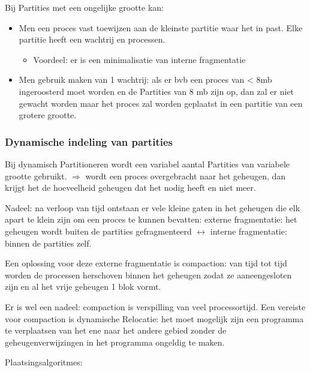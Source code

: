 Bij Partities met een ongelijke grootte kan:

\begin{itemize}
    \item Men een proces vast toewijzen aan de kleinste partitie waar het in past. Elke partitie heeft een wachtrij en processen.
        \begin{itemize}
        \item Voordeel: er is een minimalisatie van interne fragmentatie
        \end{itemize}
    \item Men gebruik maken van 1 wachtrij: als er bvb een proces van < 8mb ingeroosterd moet worden en de Partities van 8 mb zijn op, dan zal er niet gewacht worden maar het proces zal worden geplaatst in een partitie van een grotere grootte.
\end{itemize}

\subsubsection{Dynamische indeling van partities}

Bij dynamisch Partitioneren wordt een variabel aantal Partities van variabele grootte gebruikt. $\Rightarrow$ wordt een proces overgebracht naar het geheugen, dan krijgt het de hoeveelheid geheugen dat het nodig heeft en niet meer.

Nadeel: na verloop van tijd ontstaan er vele kleine gaten in het geheugen die elk apart te klein zijn om een proces te kunnen bevatten: externe fragmentatie: het geheugen wordt buiten de partities gefragmenteerd $\leftrightarrow$ interne fragmentatie: binnen de partities zelf.

Een oplossing voor deze externe fragmentatie is compaction: van tijd tot tijd worden de processen herschoven binnen het geheugen zodat ze aaneengesloten zijn en al het vrije geheugen 1 blok vormt.

Er is wel een nadeel: compaction is verspilling van veel processortijd. Een vereiste voor compaction is dynamische Relocatie: het moet mogelijk zijn een programma te verplaatsen van het ene naar het andere gebied zonder de geheugenverwijzingen in het programma ongeldig te maken.

Plaatsingsalgoritmes:

